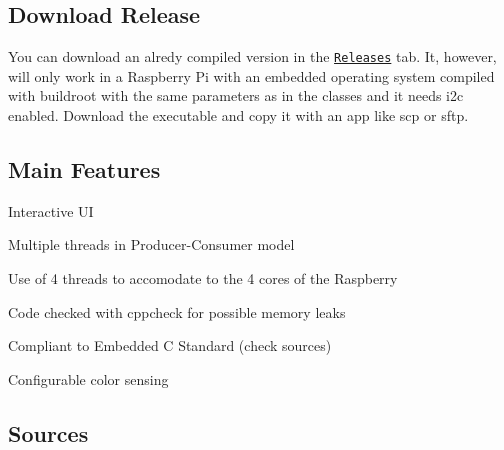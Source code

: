 \subsection*{Download Release}

You can download an alredy compiled version in the \href{https://github.com/SoraSpades/rpi-P2-final/releases}{\tt Releases} tab. It, however, will only work in a Raspberry Pi with an embedded operating system compiled with buildroot with the same parameters as in the classes and it needs i2c enabled. Download the executable and copy it with an app like {\ttfamily scp} or {\ttfamily sftp}.

\subsection*{Main Features}


\begin{DoxyItemize}
\item Interactive UI
\item Multiple threads in Producer-\/\+Consumer model
\item Use of 4 threads to accomodate to the 4 cores of the Raspberry
\item Code checked with cppcheck for possible memory leaks
\item Compliant to Embedded C Standard (check sources)
\item Configurable color sensing
\end{DoxyItemize}

\subsection*{Sources}


